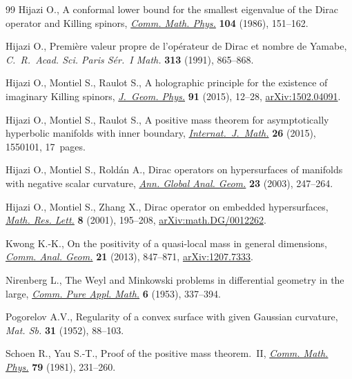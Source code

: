 \documentclass[pdftex]{sigma}
\numberwithin{equation}{section}
\begin{document}
\begin{thebibliography}{99}
Hijazi O., A conformal lower bound for the smallest eigenvalue of the {D}irac
 operator and {K}illing spinors, \href{https://doi.org/10.1007/BF01210797}{\textit{Comm. Math. Phys.}} \textbf{104}
 (1986), 151--162.

Hijazi O., Premi\`ere valeur propre de l'op\'erateur de {D}irac et nombre de
 {Y}amabe, \textit{C.~R.~Acad. Sci. Paris S\'er.~I Math.} \textbf{313} (1991),
 865--868.

Hijazi O., Montiel S., Raulot S., A holographic principle for the existence of
 imaginary {K}illing spinors, \href{https://doi.org/10.1016/j.geomphys.2015.01.012}{\textit{J.~Geom. Phys.}} \textbf{91} (2015),
 12--28, \href{https://arxiv.org/abs/1502.04091}{arXiv:1502.04091}.

Hijazi O., Montiel S., Raulot S., A positive mass theorem for asymptotically
 hyperbolic manifolds with inner boundary, \href{https://doi.org/10.1142/S0129167X15501013}{\textit{Internat.~J.~Math.}}
 \textbf{26} (2015), 1550101, 17~pages.

Hijazi O., Montiel S., Rold\'an A., Dirac operators on hypersurfaces of
 manifolds with negative scalar curvature, \href{https://doi.org/10.1023/A:1022808916165}{\textit{Ann. Global Anal. Geom.}}
 \textbf{23} (2003), 247--264.

Hijazi O., Montiel S., Zhang X., Dirac operator on embedded hypersurfaces,
 \href{https://doi.org/10.4310/MRL.2001.v8.n2.a8}{\textit{Math. Res. Lett.}} \textbf{8} (2001), 195--208,
 \href{https://arxiv.org/abs/math.DG/0012262}{arXiv:math.DG/0012262}.

Kwong K.-K., On the positivity of a quasi-local mass in general dimensions,
 \href{https://doi.org/10.4310/CAG.2013.v21.n4.a3}{\textit{Comm. Anal. Geom.}} \textbf{21} (2013), 847--871, \href{https://arxiv.org/abs/1207.7333}{arXiv:1207.7333}.

Nirenberg L., The {W}eyl and {M}inkowski problems in differential geometry in
 the large, \href{https://doi.org/10.1002/cpa.3160060303}{\textit{Comm. Pure Appl. Math.}} \textbf{6} (1953), 337--394.

Pogorelov A.V., Regularity of a convex surface with given {G}aussian curvature,
 \textit{Mat. Sb.} \textbf{31} (1952), 88--103.

Schoen R., Yau S.-T., Proof of the positive mass theorem.~{II}, \href{https://doi.org/10.1007/BF01942062}{\textit{Comm.
 Math. Phys.}} \textbf{79} (1981), 231--260.


\end{thebibliography}
\end{document}
